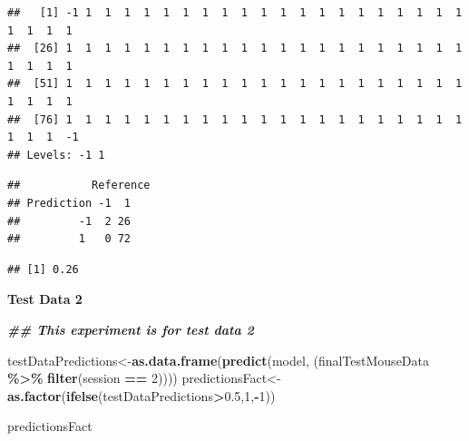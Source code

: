 \documentclass[
]{article}
\newenvironment{Shaded}{\begin{snugshade}}{\end{snugshade}}
\newcommand{\DecValTok}[1]{\textcolor[rgb]{0.00,0.00,0.81}{#1}}
\newcommand{\DocumentationTok}[1]{\textcolor[rgb]{0.56,0.35,0.01}{\textbf{\textit{#1}}}}
\newcommand{\FloatTok}[1]{\textcolor[rgb]{0.00,0.00,0.81}{#1}}
\newcommand{\FunctionTok}[1]{\textcolor[rgb]{0.13,0.29,0.53}{\textbf{#1}}}
\newcommand{\NormalTok}[1]{#1}
\newcommand{\OtherTok}[1]{\textcolor[rgb]{0.56,0.35,0.01}{#1}}
\newcommand{\SpecialCharTok}[1]{\textcolor[rgb]{0.81,0.36,0.00}{\textbf{#1}}}
\begin{document}
\begin{verbatim}
##   [1] -1 1  1  1  1  1  1  1  1  1  1  1  1  1  1  1  1  1  1  1  1  1  1  1  1 
##  [26] 1  1  1  1  1  1  1  1  1  1  1  1  1  1  1  1  1  1  1  1  1  1  1  1  1 
##  [51] 1  1  1  1  1  1  1  1  1  1  1  1  1  1  1  1  1  1  1  1  1  1  1  1  1 
##  [76] 1  1  1  1  1  1  1  1  1  1  1  1  1  1  1  1  1  1  1  1  1  1  1  1  -1
## Levels: -1 1
\end{verbatim}

\begin{Shaded}
\end{Shaded}

\begin{verbatim}
##           Reference
## Prediction -1  1
##         -1  2 26
##         1   0 72
\end{verbatim}

\begin{Shaded}
\end{Shaded}

\begin{verbatim}
## [1] 0.26
\end{verbatim}

\textbf{Test Data 2}

\begin{Shaded}
\begin{Highlighting}[]
\DocumentationTok{\#\# This experiment is for test data 2}

\NormalTok{testDataPredictions}\OtherTok{\textless{}{-}}\FunctionTok{as.data.frame}\NormalTok{(}\FunctionTok{predict}\NormalTok{(model, (finalTestMouseData }\SpecialCharTok{\%\textgreater{}\%} \FunctionTok{filter}\NormalTok{(session }\SpecialCharTok{==} \DecValTok{2}\NormalTok{))))}
\NormalTok{predictionsFact}\OtherTok{\textless{}{-}} \FunctionTok{as.factor}\NormalTok{(}\FunctionTok{ifelse}\NormalTok{(testDataPredictions}\SpecialCharTok{\textgreater{}}\FloatTok{0.5}\NormalTok{,}\DecValTok{1}\NormalTok{,}\SpecialCharTok{{-}}\DecValTok{1}\NormalTok{))}


\NormalTok{predictionsFact}
\end{Highlighting}
\end{Shaded}
\end{document}
